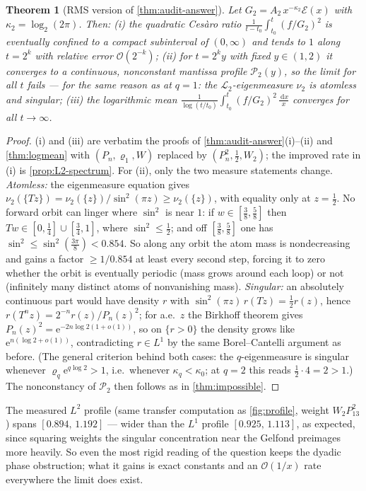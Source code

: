 \documentclass[11pt,oneside]{article}
\newtheorem{theorem}{Theorem}[section]
\theoremstyle{definition}
\theoremstyle{remark}
\newcommand{\e}{\mathrm e}
\newcommand{\dd}{\,\mathrm d}
\newcommand{\bigO}{\mathcal O}
\newcommand{\smallo}{o}
\newcommand{\T}{T}
\newcommand{\Lop}{\mathcal L}
\begin{document}
\begin{theorem}[RMS version of \cref{thm:audit-answer}]
\label{thm:rms-answer}
Let $G_2=A_2\,x^{-\kappa_2}\mathcal E(x)$ with
$\kappa_2=\log_2(2\pi)$.  Then:
(i) the quadratic Ces\`aro ratio
$\frac1{t-t_0}\int_{t_0}^t(f/G_2)^2$ is eventually confined to a compact
subinterval of $(0,\infty)$ and tends to $1$ along $t=2^k$ with relative
error $\bigO(2^{-k})$;
(ii) for $t=2^ky$ with fixed $y\in(1,2)$ it converges to a continuous,
nonconstant mantissa profile $\mathscr P_2(y)$, so the limit for all
$t$ fails --- for the same reason as at $q=1$: the $\Lop_2$-eigenmeasure
$\nu_2$ is atomless and singular;
(iii) the logarithmic mean
$\frac1{\log(t/t_0)}\int_{t_0}^t(f/G_2)^2\,\frac{\dd x}{x}$ converges
for all $t\to\infty$.
\end{theorem}

\begin{proof}
(i) and (iii) are verbatim the proofs of
\cref{thm:audit-answer}(i)--(ii) and \cref{thm:logmean} with
$(P_n,\varrho_1,W)$ replaced by $(P_n^2,\tfrac12,W_2)$; the improved
rate in (i) is \cref{prop:L2-spectrum}.  For (ii), only the two measure
statements change.  \emph{Atomless:} the eigenmeasure equation gives
$\nu_2(\{\T z\})=\nu_2(\{z\})/\sin^2(\pi z)\ge\nu_2(\{z\})$, with
equality only at $z=\tfrac12$.  No forward orbit can linger where
$\sin^2$ is near $1$: if $w\in[\tfrac38,\tfrac58]$ then
$\T w\in[0,\tfrac14]\cup[\tfrac34,1]$, where $\sin^2\le\tfrac12$; and
off $[\tfrac38,\tfrac58]$ one has $\sin^2\le\sin^2(\tfrac{3\pi}8)<0.854$.
So along any orbit the atom mass is nondecreasing and gains a factor
$\ge1/0.854$ at least every second step, forcing it to zero whether the
orbit is eventually periodic (mass grows around each loop) or not
(infinitely many distinct atoms of nonvanishing mass).
\emph{Singular:} an absolutely continuous part would have density $r$
with $\sin^2(\pi z)\,r(\T z)=\tfrac12r(z)$, hence
$r(\T^nz)=2^{-n}r(z)/P_n(z)^2$; for a.e.\ $z$ the Birkhoff theorem
gives $P_n(z)^2=\e^{-2n\log2(1+\smallo(1))}$, so on $\{r>0\}$ the
density grows like $\e^{n(\log2+\smallo(1))}$, contradicting
$r\in L^1$ by the same Borel--Cantelli argument as before.  (The general
criterion behind both cases: the $q$-eigenmeasure is singular whenever
$\varrho_q\e^{q\log2}>1$, i.e.\ whenever $\kappa_q<\kappa_0$; at
$q=2$ this reads $\tfrac12\cdot4=2>1$.)  The nonconstancy of
$\mathscr P_2$ then follows as in \cref{thm:impossible}.
\end{proof}

The measured $L^2$ profile (same transfer computation as
\cref{fig:profile}, weight $W_2P_{13}^2$) spans
$[0.894,\,1.192]$ --- wider than the $L^1$ profile
$[0.925,\,1.113]$, as expected, since squaring weights the singular
concentration near the Gelfond preimages more heavily.  So even the most
rigid reading of the question keeps the dyadic phase obstruction; what
it gains is exact constants and an $\bigO(1/x)$ rate everywhere the
limit does exist.
\end{document}
